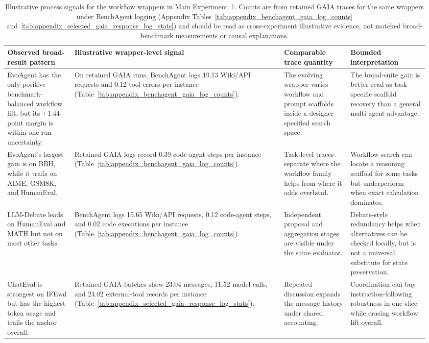\begin{table}[t]
\centering
\caption{Illustrative process signals for the workflow wrappers in Main Experiment~1. Counts are from retained GAIA traces for the same wrappers under BenchAgent logging (Appendix Tables~\ref{tab:appendix_benchagent_gaia_log_counts} and~\ref{tab:appendix_selected_gaia_response_log_stats}) and should be read as cross-experiment illustrative evidence, not matched broad-benchmark measurements or causal explanations.}
\label{tab:appendix_process_diagnostics}
\footnotesize
\setlength{\tabcolsep}{3.5pt}
\renewcommand{\arraystretch}{1.12}
\begin{tabular}{p{}p{}p{}p{}}
\toprule
\textbf{Observed broad-result pattern} & \textbf{Illustrative wrapper-level signal} & \textbf{Comparable trace quantity} & \textbf{Bounded interpretation} \\
\midrule
EvoAgent has the only positive benchmark-balanced workflow lift, but its +1.44-point margin is within one-run uncertainty. & On retained GAIA runs, BenchAgent logs 19.13 Wiki/API requests and 0.12 tool errors per instance (Table~\ref{tab:appendix_benchagent_gaia_log_counts}). & The evolving wrapper varies workflow and prompt scaffolds inside a designer-specified search space. & The broad-suite gain is better read as task-specific scaffold recovery than a general multi-agent advantage. \\
EvoAgent's largest gain is on BBH, while it trails on AIME, GSM8K, and HumanEval. & Retained GAIA logs record 0.39 code-agent steps per instance (Table~\ref{tab:appendix_benchagent_gaia_log_counts}). & Task-level traces separate where the workflow family helps from where it adds overhead. & Workflow search can locate a reasoning scaffold for some tasks but underperform when exact calculation dominates. \\
LLM-Debate leads on HumanEval and MATH but not on most other tasks. & BenchAgent logs 15.65 Wiki/API requests, 0.12 code-agent steps, and 0.02 code executions per instance (Table~\ref{tab:appendix_benchagent_gaia_log_counts}). & Independent proposal and aggregation stages are visible under the same evaluator. & Debate-style redundancy helps when alternatives can be checked locally, but is not a universal substitute for state preservation. \\
ChatEval is strongest on IFEval but has the highest token usage and trails the anchor overall. & Retained GAIA batches show 23.04 messages, 11.52 model calls, and 24.02 external-tool records per instance (Table~\ref{tab:appendix_selected_gaia_response_log_stats}). & Repeated discussion expands the message history under shared accounting. & Coordination can buy instruction-following robustness in one slice while erasing workflow lift overall. \\

\end{tabular}
\end{table}
